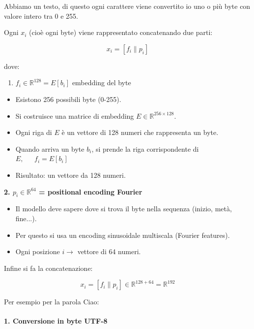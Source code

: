 \documentclass[
  11pt,
]{article}
\begin{document}
Abbiamo un testo, di questo ogni carattere viene convertito io uno o più
byte con valore intero tra 0 e 255.

Ogni \(x_{i}\) (cioè ogni byte) viene rappresentato concatenando due
parti:

\[x_{i} = \left\lbrack f_{i}\| p_{i} \right\rbrack\]

dove:

\begin{enumerate}
\def\labelenumi{\arabic{enumi}.}
\item
  \(f_{i} \in \mathbb{R}^{128} = E\left\lbrack b_{i} \right\rbrack\)
  embedding del byte
\end{enumerate}

\begin{itemize}
\item
  Esistono 256 possibili byte (0-255).
\item
  Si costruisce una matrice di embedding
  \(E \in \mathbb{R}^{256 \times 128}\).
\item
  Ogni riga di \(E\) è un vettore di 128 numeri che rappresenta un byte.
\item
  Quando arriva un byte \(b_{i}\), si prende la riga corrispondente di
  \(E,\ {\ \ \ \ \ \ f}_{i} = E\left\lbrack b_{i} \right\rbrack\)
\item
  Risultato: un vettore da 128 numeri.
\end{itemize}

\textbf{2. $p_i \in \mathbb{R}^{64}$ = positional encoding Fourier}

\begin{itemize}
\item
  Il modello deve sapere dove si trova il byte nella sequenza (inizio,
  metà, fine...).
\item
  Per questo si usa un encoding sinusoidale multiscala (Fourier
  features).
\item
  Ogni posizione \(i \rightarrow\) vettore di 64 numeri.
\end{itemize}

Infine si fa la concatenazione:

\[x_{i} = \left\lbrack f_{i}\| p_{i} \right\rbrack \in \mathbb{R}^{128 + 64} = \mathbb{R}^{192}\]

Per esempio per la parola Ciao:

\paragraph{1. \textbf{Conversione in byte UTF-8}}
\end{document}
